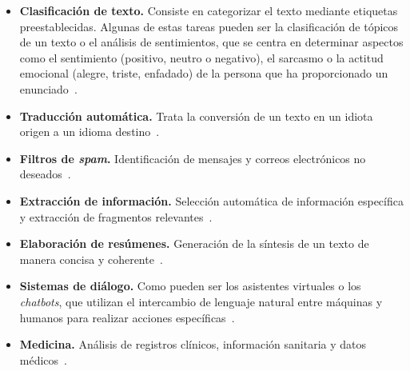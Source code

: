 \begin{itemize}
    \item \textbf{Clasificación de texto.} Consiste en categorizar el texto mediante etiquetas preestablecidas. Algunas de estas tareas pueden ser la clasificación de tópicos de un texto o el análisis de sentimientos, que se centra en determinar aspectos como el sentimiento (positivo, neutro o negativo), el sarcasmo o la actitud emocional (alegre, triste, enfadado) de la persona que ha proporcionado un enunciado~\cite{felbo2017using, kim2014convolutional}.

    \item \textbf{Traducción automática.} Trata la conversión de un texto en un idiota origen a un idioma destino~\cite{wu2016google}.

    \item \textbf{Filtros de \textit{spam}.} Identificación de mensajes y correos electrónicos no deseados~\cite{sharmin2020convolutional}.

    \item \textbf{Extracción de información.} Selección automática de información específica y extracción de fragmentos relevantes~\cite{lample2016neural}.

    \item \textbf{Elaboración de resúmenes.} Generación de la síntesis de un texto de manera concisa y coherente~\cite{see2017get}.

    \item \textbf{Sistemas de diálogo.} Como pueden ser los asistentes virtuales o los \textit{chatbots}, que utilizan el intercambio de lenguaje natural entre máquinas y humanos para realizar acciones específicas~\cite{chao2019bert}.

    \item \textbf{Medicina.} Análisis de registros clínicos, información sanitaria y datos médicos~\cite{chen2019bert}.
\end{itemize}
